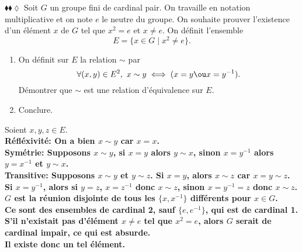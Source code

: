 \documentclass[11pt]{article}
\begin{document}
\begin{exercice}{$\blacklozenge\blacklozenge\lozenge$}{}
    Soit $G$ un groupe fini de cardinal pair. On travaille en notation multiplicative et on note $e$ le neutre du groupe. On souhaite prouver l'existence d'un élément $x$ de $G$ tel que $x^2=e$ et $x\neq e$. On définit l'ensemble
    \begin{equation*}
        E=\{x\in G\mid x^2\neq e\}.
    \end{equation*}
    \begin{enumerate}
        \item On définit sur $E$ la relation $\sim$ par
        \begin{equation*}
            \forall(x,y)\in E^2,~x\sim y\iff (x=y\ou x=y^{-1}).
        \end{equation*}
        Démontrer que $\sim$ est une relation d'équivalence sur $E$.
        \item Conclure.
    \end{enumerate}
    \tcblower
     Soient $x,y,z\in E$.\\
    \bf{Réfléxivité:} On a bien $x\sim y$ car $x=x$.\\
    \bf{Symétrie:} Supposons $x\sim y$, si $x=y$ alors $y\sim x$, sinon $x=y^{-1}$ alors $y=x^{-1}$ et $y\sim x$.\\
    \bf{Transitive:} Supposons $x\sim y$ et $y\sim z$. Si $x=y$, alors $x\sim z$ car $x=y\sim z$.\\
    Si $x=y^{-1}$, alors si $y=z$, $x=z^{-1}$ donc $x\sim z$, sinon $x=y^{-1}=z$ donc $x\sim z$.\n
     $G$ est la réunion disjointe de tous les $\{x,x^{-1}\}$ différents pour $x\in G$.\\
    Ce sont des ensembles de cardinal 2, sauf $\{e, e^{-1}\}$, qui est de cardinal 1.\\
    S'il n'existait pas d'élément $x\neq e$ tel que $x^2=e$, alors $G$ serait de cardinal impair, ce qui est absurde.\\
    Il existe donc un tel élément.
\end{exercice}
\end{document}

